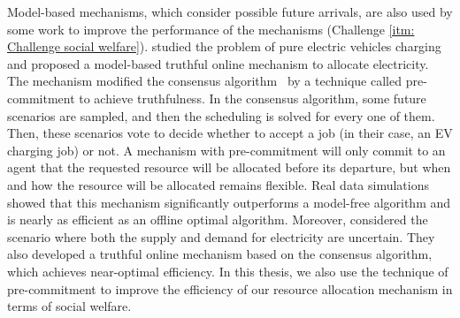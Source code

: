 \documentclass[11pt]{phdthesis}
\begin{document}
Model-based mechanisms, which consider possible future arrivals, are also used by some work to improve the performance of the mechanisms (Challenge \ref{itm: Challenge social welfare}).  \citet{stein2012model} studied the problem of pure electric vehicles charging and proposed a model-based truthful online mechanism to allocate electricity. The mechanism modified the consensus algorithm~\citep{bent2004value} by a technique called pre-commitment to achieve truthfulness. 
In the consensus algorithm, some future scenarios are sampled, and then the scheduling is solved for every one of them. Then, these scenarios vote to decide whether to accept a job (in their case, an EV charging job) or not. 
A mechanism with pre-commitment will only commit to an agent that the requested resource will be allocated before its departure, but when and how the resource will be allocated remains flexible. Real data simulations showed that this mechanism significantly outperforms a model-free algorithm and is nearly as efficient as an offline optimal algorithm. Moreover, \citet{strohle2014online} considered the scenario where both the supply and demand for electricity are uncertain. They also developed a truthful online mechanism based on the consensus algorithm, which achieves near-optimal efficiency. In this thesis, we also use the technique of pre-commitment to improve the efficiency of our resource allocation mechanism in terms of social welfare. 

\end{document}
